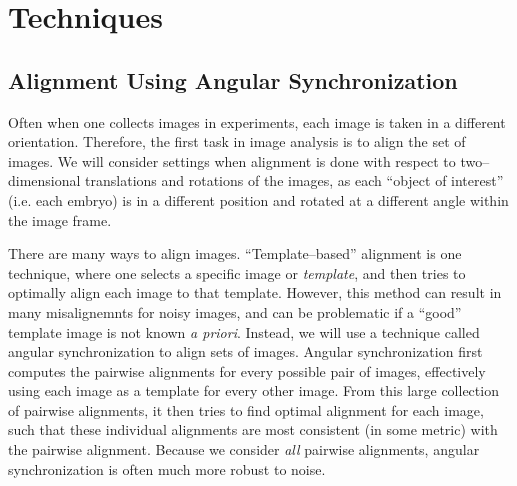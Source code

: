 \documentclass[11pt]{article}
\begin{document}
\section{Techniques}

\subsection{Alignment Using Angular Synchronization}

Often when one collects images in experiments, each image is taken in a different orientation. 
%
Therefore, the first task in image analysis is to align the set of images. 
%
We will consider settings when alignment is done with respect to two--dimensional translations and rotations of the images, as each ``object of interest'' (i.e. each embryo) is in a different position and rotated at a different angle within the image frame. 

There are many ways to align images. 
%
``Template--based'' alignment \cite{ahuja2007template} is one technique, where one selects a specific image or {\em template}, and then tries to optimally align each image to that template.
%
However, this method can result in many misalignemnts for noisy images, and can be problematic if a ``good'' template image is not known {\em a priori}. 
%
Instead, we will use a technique called angular synchronization\cite{singer2011angular} to align sets of images.
%
Angular synchronization first computes the pairwise alignments for every possible pair of images, effectively using each image as a template for every other image.
%
From this large collection of pairwise alignments, it then tries to find optimal alignment for each image, such that these individual alignments are most consistent (in some metric) with the pairwise alignment.
%
Because we consider {\em all} pairwise alignments, angular synchronization is often much more robust to noise. 
\end{document}
